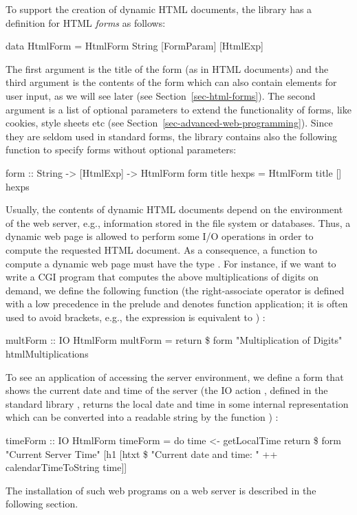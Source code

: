 To support the creation of dynamic HTML documents, the  library
has a definition for HTML \emph{forms}
as follows:
\begin{prog}
data HtmlForm = HtmlForm String [FormParam] [HtmlExp] 
\end{prog}
The first argument is the title of the form (as in HTML documents)
and the third argument is the contents of the form
which can also contain elements for user input, as
we will see later (see Section~\ref{sec-html-forms}).
The second argument is a list of optional parameters
to extend the functionality of forms, like cookies,
style sheets etc (see Section~\ref{sec-advanced-web-programming}).
Since they are seldom used in standard forms,
the  library contains also the following function
to specify forms without optional parameters:
\begin{prog}
form :: String -> [HtmlExp] -> HtmlForm
form title hexps = HtmlForm title [] hexps
\end{prog}
%
Usually, the contents of dynamic HTML documents depend on the
environment of the web server, e.g., information stored in the
file system or databases. Thus, a dynamic web page is allowed to
perform some I/O operations in order to compute the requested
HTML document. As a consequence, a function to compute
a dynamic web page must have
the type . For instance, if we want to
write a CGI program that computes the above multiplications
of digits on demand, we define the following function 
(the right-associate operator \ccode{\$}\pindex{\$} is
defined with a low precedence
in the prelude and denotes function application; it is often used to avoid
brackets, e.g., the expression  is equivalent to
)
:
\begin{prog}
multForm :: IO HtmlForm
multForm = return \$ form "Multiplication of Digits" htmlMultiplications
\end{prog}
To see an application of accessing the server environment,
we define a form that shows the current date and time of the server
(the IO action ,
defined in the standard library , returns the local
date and time in some internal representation which can be
converted into a readable string by the function
)
:
\begin{prog}
timeForm :: IO HtmlForm
timeForm = do
 time <- getLocalTime
 return \$ form "Current Server Time"
          [h1 [htxt \$ "Current date and time: " ++ calendarTimeToString time]]
\end{prog}
%
The installation of such web programs on a web server is described
in the following section.

